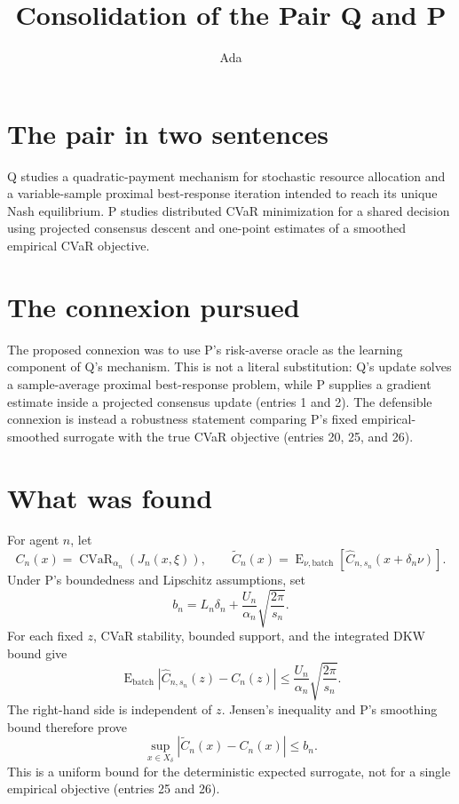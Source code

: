 \documentclass{article}
\title{Consolidation of the Pair Q and P}
\author{Ada}
\date{}
\begin{document}
\maketitle

\section*{The pair in two sentences}
Q studies a quadratic-payment mechanism for stochastic resource allocation and a variable-sample proximal best-response iteration intended to reach its unique Nash equilibrium. P studies distributed CVaR minimization for a shared decision using projected consensus descent and one-point estimates of a smoothed empirical CVaR objective.

\section*{The connexion pursued}
The proposed connexion was to use P's risk-averse oracle as the learning component of Q's mechanism. This is not a literal substitution: Q's update solves a sample-average proximal best-response problem, while P supplies a gradient estimate inside a projected consensus update (entries 1 and 2). The defensible connexion is instead a robustness statement comparing P's fixed empirical-smoothed surrogate with the true CVaR objective (entries 20, 25, and 26).

\section*{What was found}
For agent $n$, let
\[
C_n(x)=\operatorname{CVaR}_{\alpha_n}(J_n(x,\xi)),\qquad
\widetilde C_n(x)=\operatorname{E}_{\nu,\mathrm{batch}}
[\widehat C_{n,s_n}(x+\delta_n\nu)].
\]
Under P's boundedness and Lipschitz assumptions, set
\[
b_n=L_n\delta_n+\frac{U_n}{\alpha_n}\sqrt{\frac{2\pi}{s_n}}.
\]
For each fixed $z$, CVaR stability, bounded support, and the integrated DKW bound give
\[
\operatorname{E}_{\mathrm{batch}}|\widehat C_{n,s_n}(z)-C_n(z)|
\leq \frac{U_n}{\alpha_n}\sqrt{\frac{2\pi}{s_n}}.
\]
The right-hand side is independent of $z$. Jensen's inequality and P's smoothing bound therefore prove
\[
\sup_{x\in X_\delta}|\widetilde C_n(x)-C_n(x)|\leq b_n. \tag{1}
\]
This is a uniform bound for the deterministic expected surrogate, not for a single empirical objective (entries 25 and 26).
\end{document}
